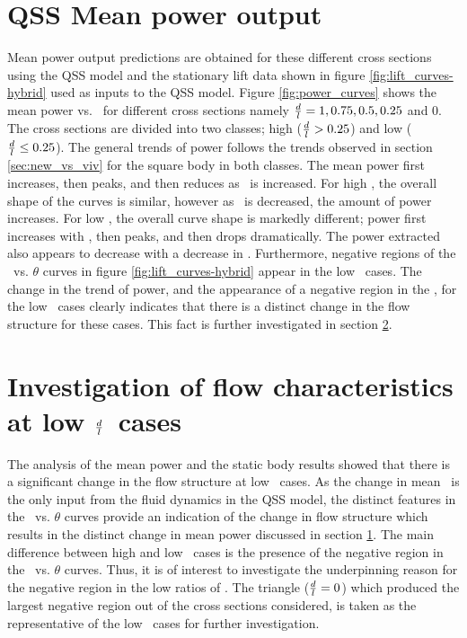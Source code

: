  
 
 \section{QSS Mean power output}
 \label{sec:cross-sec-qss-mean power}
 
 
 
 Mean power output predictions are obtained for these different cross sections using the QSS model and the stationary lift data shown in figure \ref{fig:lift_curves-hybrid} used as inputs to the QSS model. Figure \ref{fig:power_curves} shows the mean power vs. \massdamp\ for different cross sections namely $\frac{d}{l}=1,0.75,0.5,0.25$ and $0$. The cross sections are divided into two classes; high ($\frac{d}{l} > 0.25$) and low ($\frac{d}{l} \leq 0.25$). The general trends of power follows the trends observed in section \ref{sec:new_vs_viv} for the square body in both classes. The mean power first increases, then peaks, and then reduces as \massdamp\ is increased. For high \ratio, the overall shape of the curves is similar, however as \ratio\ is decreased, the amount of power increases. For low \ratio, the overall curve shape is markedly different; power first increases with \massdamp, then peaks, and then drops dramatically. The power extracted also appears to decrease with a decrease in \ratio. Furthermore, negative regions of the \cy\ vs. $\theta$ curves in figure \ref{fig:lift_curves-hybrid} appear in the low \ratio\ cases. The change in the trend of power, and the appearance of a negative region in the \cy, for the low \ratio\ cases clearly indicates that there is a distinct change in the flow structure for these cases. This fact is further investigated in section \ref{sec:negative-region}.

\section{Investigation of flow characteristics at low $\frac{d}{l}$\ cases}
 \label{sec:negative-region}

The analysis of the mean power and the static body results showed that there is a significant change in the flow structure at low \ratio\ cases. As the change in mean \cy\ is the only input from the fluid dynamics in the QSS model, the distinct features in the \cy\ vs. $\theta$ curves provide an indication of the change in flow structure which results in the distinct change in mean power discussed in section \ref{sec:cross-sec-qss-mean power}. The main difference between high and low \ratio\ cases is the presence of the negative region in the \cy\ vs. $\theta$ curves. Thus, it is of interest to investigate the underpinning reason for the negative region in the low ratios of \ratio. The triangle ($\frac{d}{l}=0$) which produced the largest negative region out of the cross sections considered, is taken as the representative of the low \ratio\ cases for further investigation. 

